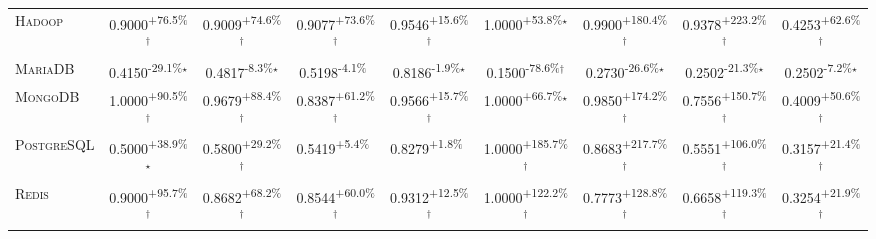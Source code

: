 \begin{table}[htbp]
\begin{tabular}{l|cccc|cccc}
\textsc{Hadoop} & \cellcolor{green!30}0.9000\textsuperscript{+76.5\%}$^\dagger$ & \cellcolor{green!30}0.9009\textsuperscript{+74.6\%}$^\dagger$ & \cellcolor{green!30}0.9077\textsuperscript{+73.6\%}$^\dagger$ & \cellcolor{green!30}0.9546\textsuperscript{+15.6\%}$^\dagger$ & \cellcolor{green!30}1.0000\textsuperscript{+53.8\%}$^\star$ & \cellcolor{green!30}0.9900\textsuperscript{+180.4\%}$^\dagger$ & \cellcolor{green!30}0.9378\textsuperscript{+223.2\%}$^\dagger$ & \cellcolor{green!30}0.4253\textsuperscript{+62.6\%}$^\dagger$ \\
\textsc{MariaDB} & \cellcolor{red!30}0.4150\textsuperscript{-29.1\%}$^\star$ & \cellcolor{red!30}0.4817\textsuperscript{-8.3\%}$^\star$ & \cellcolor{red!30}0.5198\textsuperscript{-4.1\%}$^{\,\,\,}$ & \cellcolor{red!30}0.8186\textsuperscript{-1.9\%}$^\star$ & \cellcolor{red!30}0.1500\textsuperscript{-78.6\%}$^\dagger$ & \cellcolor{red!30}0.2730\textsuperscript{-26.6\%}$^\star$ & \cellcolor{red!30}0.2502\textsuperscript{-21.3\%}$^\star$ & \cellcolor{red!30}0.2502\textsuperscript{-7.2\%}$^\star$ \\
\textsc{MongoDB} & \cellcolor{green!30}1.0000\textsuperscript{+90.5\%}$^\dagger$ & \cellcolor{green!30}0.9679\textsuperscript{+88.4\%}$^\dagger$ & \cellcolor{green!30}0.8387\textsuperscript{+61.2\%}$^\dagger$ & \cellcolor{green!30}0.9566\textsuperscript{+15.7\%}$^\dagger$ & \cellcolor{green!30}1.0000\textsuperscript{+66.7\%}$^\star$ & \cellcolor{green!30}0.9850\textsuperscript{+174.2\%}$^\dagger$ & \cellcolor{green!30}0.7556\textsuperscript{+150.7\%}$^\dagger$ & \cellcolor{green!30}0.4009\textsuperscript{+50.6\%}$^\dagger$ \\
\textsc{PostgreSQL} & \cellcolor{green!30}0.5000\textsuperscript{+38.9\%}$^\star$ & \cellcolor{green!30}0.5800\textsuperscript{+29.2\%}$^\dagger$ & \cellcolor{green!30}0.5419\textsuperscript{+5.4\%}$^{\,\,\,}$ & \cellcolor{green!30}0.8279\textsuperscript{+1.8\%}$^{\,\,\,}$ & \cellcolor{green!30}1.0000\textsuperscript{+185.7\%}$^\dagger$ & \cellcolor{green!30}0.8683\textsuperscript{+217.7\%}$^\dagger$ & \cellcolor{green!30}0.5551\textsuperscript{+106.0\%}$^\dagger$ & \cellcolor{green!30}0.3157\textsuperscript{+21.4\%}$^\dagger$ \\
\textsc{Redis} & \cellcolor{green!30}0.9000\textsuperscript{+95.7\%}$^\dagger$ & \cellcolor{green!30}0.8682\textsuperscript{+68.2\%}$^\dagger$ & \cellcolor{green!30}0.8544\textsuperscript{+60.0\%}$^\dagger$ & \cellcolor{green!30}0.9312\textsuperscript{+12.5\%}$^\dagger$ & \cellcolor{green!30}1.0000\textsuperscript{+122.2\%}$^\dagger$ & \cellcolor{green!30}0.7773\textsuperscript{+128.8\%}$^\dagger$ & \cellcolor{green!30}0.6658\textsuperscript{+119.3\%}$^\dagger$ & \cellcolor{green!30}0.3254\textsuperscript{+21.9\%}$^\dagger$ \\

\end{tabular}
\end{table}
